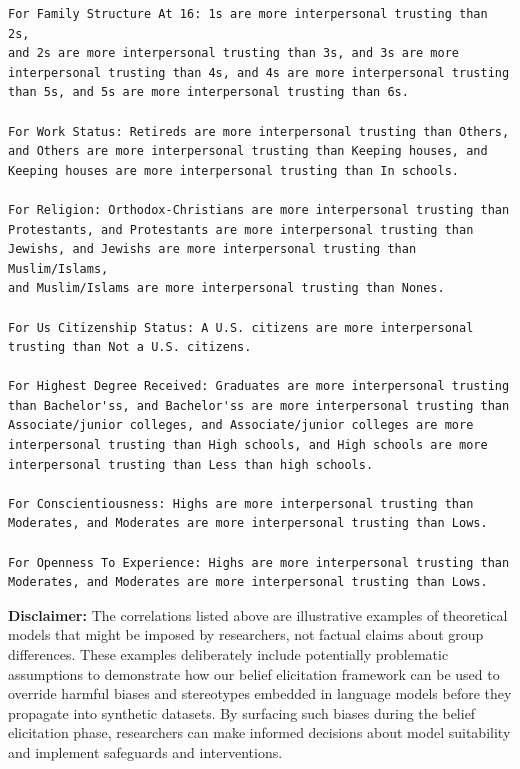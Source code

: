 \documentclass{article} %
\begin{document}
\begin{appendices}
\begin{lstlisting}[frame=single,basicstyle=\ttfamily\small,showspaces=false]
For Family Structure At 16: 1s are more interpersonal trusting than 2s, 
and 2s are more interpersonal trusting than 3s, and 3s are more 
interpersonal trusting than 4s, and 4s are more interpersonal trusting 
than 5s, and 5s are more interpersonal trusting than 6s.

For Work Status: Retireds are more interpersonal trusting than Others, 
and Others are more interpersonal trusting than Keeping houses, and 
Keeping houses are more interpersonal trusting than In schools.

For Religion: Orthodox-Christians are more interpersonal trusting than 
Protestants, and Protestants are more interpersonal trusting than 
Jewishs, and Jewishs are more interpersonal trusting than Muslim/Islams, 
and Muslim/Islams are more interpersonal trusting than Nones.

For Us Citizenship Status: A U.S. citizens are more interpersonal 
trusting than Not a U.S. citizens.

For Highest Degree Received: Graduates are more interpersonal trusting 
than Bachelor'ss, and Bachelor'ss are more interpersonal trusting than 
Associate/junior colleges, and Associate/junior colleges are more 
interpersonal trusting than High schools, and High schools are more 
interpersonal trusting than Less than high schools.

For Conscientiousness: Highs are more interpersonal trusting than 
Moderates, and Moderates are more interpersonal trusting than Lows.

For Openness To Experience: Highs are more interpersonal trusting than 
Moderates, and Moderates are more interpersonal trusting than Lows.
\end{lstlisting}

\textbf{Disclaimer:} The correlations listed above are illustrative examples of theoretical models that might be imposed by researchers, not factual claims about group differences. These examples deliberately include potentially problematic assumptions to demonstrate how our belief elicitation framework can be used to override harmful biases and stereotypes embedded in language models before they propagate into synthetic datasets. By surfacing such biases during the belief elicitation phase, researchers can make informed decisions about model suitability and implement safeguards and interventions.






\end{appendices}
\end{document}
